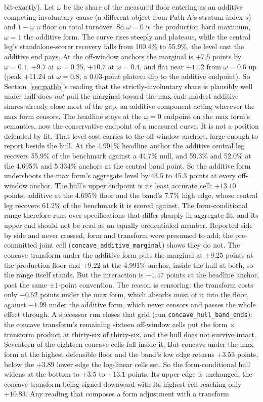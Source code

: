 \documentclass[12pt]{article}
\begin{document}
bit-exactly). Let $\omega$ be the share of the measured floor entering as an additive competing involuntary cause (a different object from Path A's stratum index $s$) and $1-\omega$ a floor on total turnover. So $\omega = 0$ is the production hard maximum, $\omega = 1$ the additive form. The curve rises steeply and plateaus, while the central leg's standalone-scorer recovery falls from 100.4\% to 55.9\%, the level cost the additive end pays. At the off-window anchors the marginal is $+7.5$ points by $\omega = 0.1$, $+9.7$ at $\omega = 0.25$, $+10.7$ at $\omega = 0.4$, and flat near $+11.2$ from $\omega = 0.6$ up (peak $+11.24$ at $\omega = 0.8$, a 0.03-point plateau dip to the additive endpoint). So Section~\ref{sec:pathb}'s reading that the strictly-involuntary share is plausibly well under half does \emph{not} pull the marginal toward the max end: modest additive shares already close most of the gap, an additive component acting wherever the max form censors. The headline stays at the $\omega = 0$ endpoint on the max form's semantics, now the conservative endpoint of a measured curve. It is not a position defended by fit. That level cost carries to the off-window anchors, large enough to report beside the hull. At the 4.991\% headline anchor the additive central leg recovers 55.9\% of the benchmark against a 44.7\% null, and 59.3\% and 52.0\% at the 4.695\% and 5.334\% anchors at the central band point. So the additive form undershoots the max form's aggregate level by 43.5 to 45.3 points at every off-window anchor. The hull's upper endpoint is its least accurate cell: $+13.10$ points, additive at the 4.695\% floor and the band's 7.7\% high edge, whose central leg recovers 61.2\% of the benchmark it is scored against. The form-conditional range therefore runs over specifications that differ sharply in aggregate fit, and its upper end should not be read as an equally credentialed member. Reported side by side and never crossed, form and transform were presumed to add; the pre-committed joint cell (\texttt{concave\_additive\_marginal}) shows they do not. The concave transform under the additive form puts the marginal at $+9.25$ points at the production floor and $+9.22$ at the 4.991\% anchor, inside the hull at both, so the range itself stands. But the interaction is $-1.47$ points at the headline anchor, past the same $\pm 1$-point convention. The reason is censoring: the transform costs only $-0.52$ points under the max form, which absorbs most of it into the floor, against $-1.99$ under the additive form, which never censors and passes the whole effect through. A successor run closes that grid (run \texttt{concave\_hull\_band\_ends}): the concave transform's remaining sixteen off-window cells put the form $\times$ transform product at thirty-six of thirty-six, and the hull does not survive intact. Seventeen of the eighteen concave cells fall inside it. But concave under the max form at the highest defensible floor and the band's low edge returns $+3.53$ points, below the $+3.89$ lower edge the log-linear cells set. So the form-conditional hull widens at the bottom to $+3.5$ to $+13.1$ points. Its upper edge is unchanged, the concave transform being signed downward with its highest cell reaching only $+10.83$. Any reading that composes a form adjustment with a transform 
\end{document}
